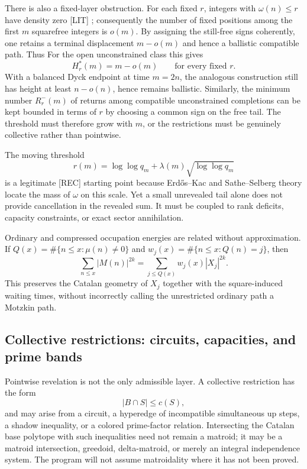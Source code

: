 \documentclass[11pt]{amsart}
\numberwithin{equation}{section}
\theoremstyle{plain}
\theoremstyle{definition}
\theoremstyle{remark}
\begin{document}
There is also a fixed-layer obstruction.  For each fixed $r$, integers with
$\omega(n)\le r$ have density zero \textup{[LIT]} \cite{HardyRamanujan1917}; consequently the number of
fixed positions among the first $m$ squarefree integers is $o(m)$.  By assigning
the still-free signs coherently, one retains a terminal displacement
$m-o(m)$ and hence a ballistic compatible path.  Thus
For the open unconstrained class this gives
\begin{equation}
H_r^*(m)=m-o(m)
\qquad\text{for every fixed }r.
\label{eq:v9_fixed_layer_obstruction}
\end{equation}
With a balanced Dyck endpoint at time $m=2n$, the analogous construction still
has height at least $n-o(n)$, hence remains ballistic.  Similarly, the minimum
number $R_r^-(m)$ of returns among compatible unconstrained completions can be
kept bounded in terms of $r$ by choosing a common sign on the free tail.  The
threshold must therefore grow with $m$, or the restrictions must be genuinely
collective rather than pointwise.

The moving threshold
\begin{equation}
r(m)=\log\log q_m+\lambda(m)\sqrt{\log\log q_m}
\label{eq:v9_moving_omega}
\end{equation}
is a legitimate \textup{[REC]} starting point because Erd\H{o}s--Kac and
Sathe--Selberg theory locate the mass of $\omega$ on this scale.  Yet a small
unrevealed tail alone does not provide cancellation in the revealed sum.  It
must be coupled to rank deficits, capacity constraints, or exact sector
annihilation.

Ordinary and compressed occupation energies are related without approximation.
If $Q(x)=\#\{n\le x:\mu(n)\ne0\}$ and
$w_j(x)=\#\{n\le x:Q(n)=j\}$, then
\begin{equation}
\sum_{n\le x}|M(n)|^{2k}
=\sum_{j\le Q(x)}w_j(x)|X_j|^{2k}.
\label{eq:v9_waiting_energy}
\end{equation}
This preserves the Catalan geometry of $X_j$ together with the square-induced
waiting times, without incorrectly calling the unrestricted ordinary path a
Motzkin path.

\subsection{Collective restrictions: circuits, capacities, and prime bands}

Pointwise revelation is not the only admissible layer.  A collective
restriction has the form
\begin{equation}
|B\cap S|\le c(S),
\label{eq:v9_capacity_constraint}
\end{equation}
and may arise from a circuit, a hyperedge of incompatible simultaneous up
steps, a shadow inequality, or a colored prime-factor relation.  Intersecting
the Catalan base polytope with such inequalities need not remain a matroid; it
may be a matroid intersection, greedoid, delta-matroid, or merely an integral
independence system.  The program will not assume matroidality where it has not
been proved.
\end{document}
